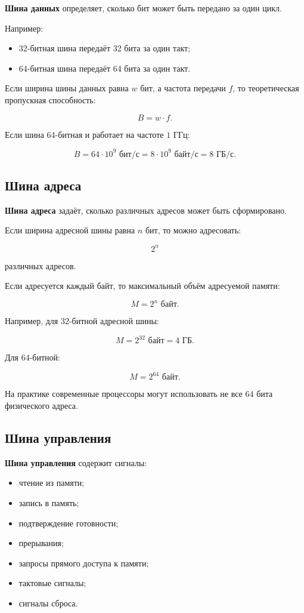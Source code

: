\documentclass[12pt,a4paper]{article}
\theoremstyle{remark}
\begin{document}
\textbf{Шина данных} определяет, сколько бит может быть передано за один цикл.

Например:
\begin{itemize}
    \item 32-битная шина передаёт 32 бита за один такт;
    \item 64-битная шина передаёт 64 бита за один такт.
\end{itemize}

Если ширина шины данных равна $w$ бит, а частота передачи $f$, то теоретическая пропускная способность:

\[
B = w \cdot f.
\]

Если шина 64-битная и работает на частоте $1$ ГГц:

\[
B = 64 \cdot 10^9 \text{ бит/с} = 8 \cdot 10^9 \text{ байт/с} = 8 \text{ ГБ/с}.
\]

\subsection{Шина адреса}

\textbf{Шина адреса} задаёт, сколько различных адресов может быть сформировано.

Если ширина адресной шины равна $n$ бит, то можно адресовать:

\[
2^n
\]

различных адресов.

Если адресуется каждый байт, то максимальный объём адресуемой памяти:

\[
M = 2^n \text{ байт}.
\]

Например, для 32-битной адресной шины:

\[
M = 2^{32} \text{ байт} = 4 \text{ ГБ}.
\]

Для 64-битной:

\[
M = 2^{64} \text{ байт}.
\]

На практике современные процессоры могут использовать не все 64 бита физического адреса.

\subsection{Шина управления}

\textbf{Шина управления} содержит сигналы:
\begin{itemize}
    \item чтение из памяти;
    \item запись в память;
    \item подтверждение готовности;
    \item прерывания;
    \item запросы прямого доступа к памяти;
    \item тактовые сигналы;
    \item сигналы сброса.
\end{itemize}
\end{document}
